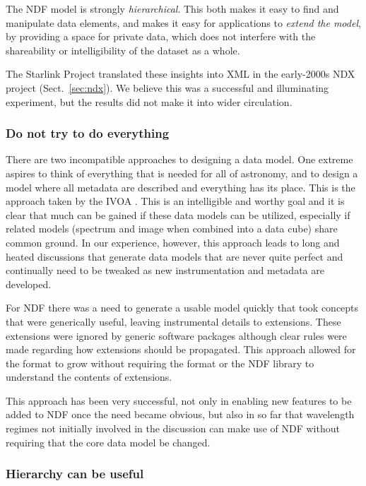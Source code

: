 \documentclass[final,authoryear,5p,times,twocolumn]{elsarticle}
\newcommand*\secref[1]{Sect.~\ref{#1}}
\begin{document}
The NDF model is strongly \emph{hierarchical}.  This both makes it
easy to find and manipulate data elements, and makes it easy for
applications to \emph{extend the model}, by providing a space for
private data, which does not interfere with the shareability or
intelligibility of the dataset as a whole.

The Starlink Project translated these insights into XML in
the early-2000s NDX project (\secref{sec:ndx}).  We believe this was a
successful and illuminating experiment, but the results did not make
it into wider circulation.

\subsubsection{Do not try to do everything}

There are two incompatible approaches to designing a data model. One
extreme aspires to think of everything that is needed for
all of astronomy, and to design a model where all metadata are
described and everything has its place. This is the approach taken by
the IVOA \citep[see e.g.][]{2012arXiv1204.3055M}. This is an
intelligible and worthy goal and it is clear that
much can be gained if these data models can be utilized, especially if
related models (spectrum and image when combined into a data cube)
share common ground.  In our experience, however, this approach leads to long and
heated discussions that generate data models that are never quite
perfect and continually need to be tweaked as new instrumentation and
metadata are developed.

For NDF there was a need to generate a usable model quickly that took
concepts that were generically useful, leaving instrumental details to
extensions. These extensions were ignored by generic software packages
although clear rules were made regarding how extensions should be
propagated. This approach allowed for the format to grow without
requiring the format or the NDF library to understand the
contents of extensions.

This approach has been very successful, not only in enabling new
features to be added to NDF once the need became obvious, but also
in so far that wavelength regimes not initially involved in the
discussion can make use of NDF without requiring that the core data
model be changed.

\subsubsection{Hierarchy can be useful}
\end{document}
